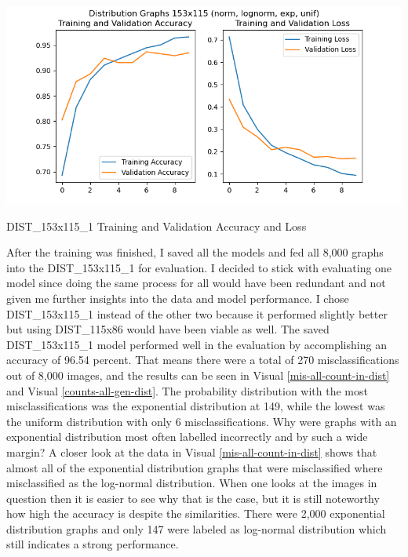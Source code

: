 \documentclass[12pt]{article}
\begin{document}
\begin{table}
\begin{center}
                    \includegraphics[scale=0.6]{DIST_153x115_1_HIST_RESULTS.png}
                    \caption{DIST\_153x115\_1 Training and Validation Accuracy and Loss}
                    \label{dist-153-115-val-loss}
        
                \end{center}
             
                
            \end{table}

            After the training was finished, I saved all the models and fed all 8,000 graphs into the DIST\_153x115\_1 for evaluation. 
            I decided to stick with evaluating one model since doing the same process for all would have been redundant 
            and not given me further insights into the data and model performance. 
            I chose DIST\_153x115\_1 instead of the other two because it performed slightly better 
            but using DIST\_115x86 would have been viable as well. The saved DIST\_153x115\_1 model performed well in the evaluation 
            by accomplishing an accuracy of 96.54 percent. That means there were a total of 270 misclassifications out of 8,000 images,
            and the results can be seen in Visual \ref{mis-all-count-in-dist} and Visual \ref{counts-all-gen-dist}.
            The probability distribution with the most misclassifications was the exponential distribution at 149, 
            while the lowest was the uniform distribution with only 6 misclassifications. 
            Why were graphs with an exponential distribution most often labelled incorrectly 
            and by such a wide margin? A closer look at the data in Visual \ref{mis-all-count-in-dist} shows that almost all of the exponential distribution graphs 
            that were misclassified where misclassified as the log-normal distribution. 
            When one looks at the images in question then it is easier to see why that is the case, 
            but it is still noteworthy how high the accuracy is despite the similarities. 
            There were 2,000 exponential distribution graphs and only 147 were labeled as log-normal distribution 
            which still indicates a strong performance.
\end{document}
